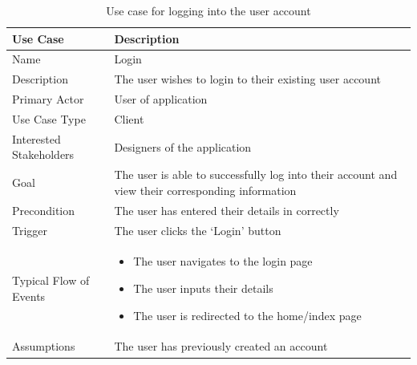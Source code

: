 \documentclass[10pt,twocolumn]{witseiepaper}
\begin{document}
		\begin{table}[h]
			\centering
			\caption{Use case for logging into the user account}
			\label{uc:login}
			\begin{tabular}{|p{}|p{}|}
				\hline
				\textbf{Use Case} & \textbf{Description} \\ \hline
				Name & Login \\ \hline
				Description & The user wishes to login to their existing user account \\ \hline
				Primary Actor & User of application \\ \hline
				Use Case Type & Client \\ \hline
				Interested Stakeholders & Designers of the application \\ \hline
				Goal & The user is able to successfully log into their account and view their corresponding information \\ \hline
				Precondition & The user has entered their details in correctly \\ \hline
				Trigger & The user clicks the `Login' button \\ \hline
				Typical Flow of Events & 
				\begin{itemize}
					\item The user navigates to the login page
					\item The user inputs their details
					\item The user is redirected to the home/index page
				\end{itemize}
				\\ \hline
				Assumptions & The user has previously created an account \\
				\hline
			\end{tabular}
		\end{table}
		
\end{document}
